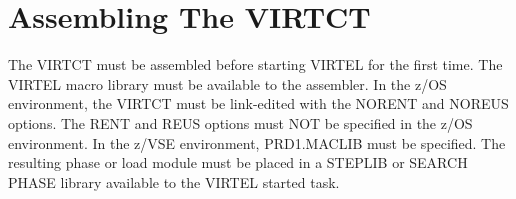 \documentclass[letterpaper,10pt,english]{sphinxmanual}
\begin{document}
\begin{sphinxVerbatim}[commandchars=\\\{\}]
          
 
   
   
   
\end{sphinxVerbatim}


\ignorespaces 

\section{Assembling The VIRTCT}
\label{\detokenize{Installation_Guide:index-146}}\label{\detokenize{Installation_Guide:id8}}
The VIRTCT must be assembled before starting VIRTEL for the first time. The VIRTEL macro library must be available to the assembler. In the z/OS environment, the VIRTCT must be link-edited with the NORENT and NOREUS options. The RENT and REUS options must NOT be specified in the z/OS environment. In the z/VSE environment, PRD1.MACLIB must be specified. The resulting phase or load module must be placed in a STEPLIB or SEARCH PHASE library available to the VIRTEL started task.
\end{document}
